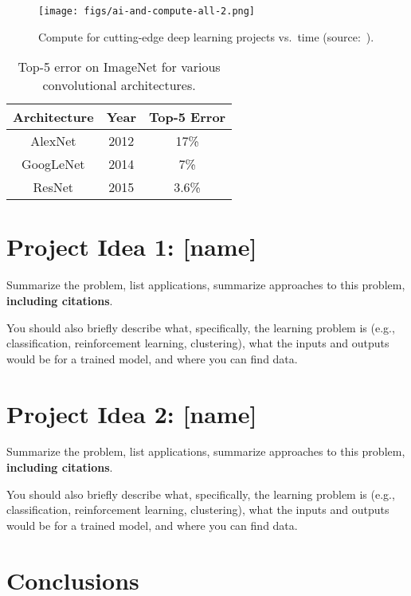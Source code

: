 \documentclass{report}
\begin{document}
\begin{figure}
    \centering
    \texttt{[image: figs/ai-and-compute-all-2.png]}
    \caption{Compute for cutting-edge deep learning projects vs.\ time (source:~\cite{AI-compute18}).}
    \label{fig:compute}
\end{figure}

\begin{table}[]
    \centering \caption{Top-5 error on ImageNet for various convolutional architectures.}
    \begin{tabular}{|c|c|c|} \hline
      Architecture   &  Year & Top-5 Error \\ \hline
    AlexNet & 2012     & 17\% \\
    GoogLeNet & 2014 & 7\% \\
    ResNet & 2015 & 3.6\% \\ \hline
    \end{tabular}
 
    \label{tab:CNN-perf}
\end{table}

\section{Project Idea 1: [name]}

Summarize the problem, list applications, summarize approaches to this problem, {\bf including citations}. 

You should also briefly describe what, specifically, the learning problem is (e.g., classification, reinforcement learning, clustering), what the inputs and outputs would be for a trained model, and where you can find data. 


\section{Project Idea 2: [name]}

Summarize the problem, list applications, summarize approaches to this problem, {\bf including citations}. 

You should also briefly describe what, specifically, the learning problem is (e.g., classification, reinforcement learning, clustering), what the inputs and outputs would be for a trained model, and where you can find data. 

\section{Conclusions}
\end{document}
